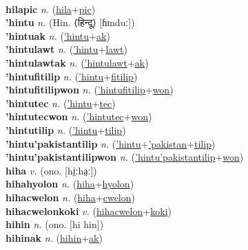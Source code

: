  \label{hilapowikiles} \\
\textbf{hilapic} \textit{n.} (\hyperref[hila]{hila}+\hyperref[pic]{pic})
 \label{hilapic} \\
\textbf{'hintu} \textit{n.} (Hin. ⟨हिन्दू⟩ [ɦɪnduː])
 \label{'hintu} \\
\textbf{'hintuak} \textit{n.} (\hyperref['hintu]{'hintu}+\hyperref[ak]{ak})
 \label{'hintuak} \\
\textbf{'hintulawt} \textit{n.} (\hyperref['hintu]{'hintu}+\hyperref[lawt]{lawt})
 \label{'hintulawt} \\
\textbf{'hintulawtak} \textit{n.} (\hyperref['hintulawt]{'hintulawt}+\hyperref[ak]{ak})
 \label{'hintulawtak} \\
\textbf{'hintufitilip} \textit{n.} (\hyperref['hintu]{'hintu}+\hyperref[fitilip]{fitilip})
 \label{'hintufitilip} \\
\textbf{'hintufitilipwon} \textit{n.} (\hyperref['hintufitilip]{'hintufitilip}+\hyperref[won]{won})
 \label{'hintufitilipwon} \\
\textbf{'hintutec} \textit{n.} (\hyperref['hintu]{'hintu}+\hyperref[tec]{tec})
 \label{'hintutec} \\
\textbf{'hintutecwon} \textit{n.} (\hyperref['hintutec]{'hintutec}+\hyperref[won]{won})
 \label{'hintutecwon} \\
\textbf{'hintutilip} \textit{n.} (\hyperref['hintu]{'hintu}+\hyperref[tilip]{tilip})
 \label{'hintutilip} \\
\textbf{'hintu'pakistantilip} \textit{n.} (\hyperref['hintu]{'hintu}+\hyperref['pakistan]{'pakistan}+\hyperref[tilip]{tilip})
 \label{'hintu'pakistantilip} \\
\textbf{'hintu'pakistantilipwon} \textit{n.} (\hyperref['hintu'pakistantilip]{'hintu'pakistantilip}+\hyperref[won]{won})
 \label{'hintu'pakistantilipwon} \\
\textbf{hiha} \textit{v.} (ono. [hi̤ːha̤ː])
 \label{hiha} \\
\textbf{hihahyolon} \textit{n.} (\hyperref[hiha]{hiha}+\hyperref[hyolon]{hyolon})
 \label{hihahyolon} \\
\textbf{hihacwelon} \textit{n.} (\hyperref[hiha]{hiha}+\hyperref[cwelon]{cwelon})
 \label{hihacwelon} \\
\textbf{hihacwelonkoki} \textit{v.} (\hyperref[hihacwelon]{hihacwelon}+\hyperref[koki]{koki})
 \label{hihacwelonkoki} \\
\textbf{hihin} \textit{n.} (ono. [hi hin])
 \label{hihin} \\
\textbf{hihinak} \textit{n.} (\hyperref[hihin]{hihin}+\hyperref[ak]{ak})
